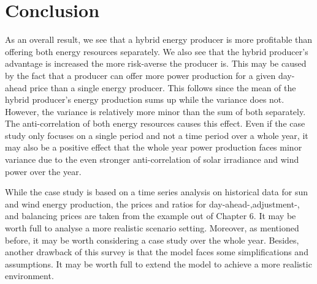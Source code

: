 \section{Conclusion}

As an overall result, we see that a hybrid energy producer is more profitable than offering both energy resources separately. We also see that the hybrid producer's advantage is increased the more risk-averse the producer is. This may be caused by the fact that a producer can offer more power production for a given day-ahead price than a single energy producer. This follows since the mean of the hybrid producer's energy production sums up while the variance does not. However, the variance is relatively more minor than the sum of both separately. The anti-correlation of both energy resources causes this effect. 
Even if the case study only focuses on a single period and not a time period over a whole year, it may also be a positive effect that the whole year power production faces minor variance due to the even stronger anti-correlation of solar irradiance and wind power over the year. 

While the case study is based on a time series analysis on historical data for sun and wind energy production, the prices and ratios for day-ahead-,adjustment-, and balancing prices are taken from the example out of \cite{Conejo10} Chapter 6. It may be worth full to analyse a more realistic scenario setting. Moreover, as mentioned before, it may be worth considering a case study over the whole year. 
Besides, another drawback of this survey is that the model faces some simplifications and assumptions. It may be worth full to extend the model to achieve a more realistic environment. 